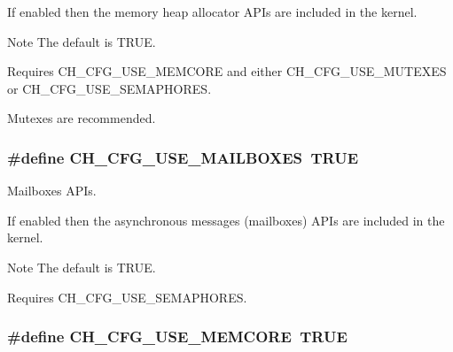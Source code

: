 If enabled then the memory heap allocator A\+P\+Is are included in the kernel.

\begin{DoxyNote}{Note}
The default is {\ttfamily T\+R\+U\+E}. 

Requires {\ttfamily C\+H\+\_\+\+C\+F\+G\+\_\+\+U\+S\+E\+\_\+\+M\+E\+M\+C\+O\+R\+E} and either {\ttfamily C\+H\+\_\+\+C\+F\+G\+\_\+\+U\+S\+E\+\_\+\+M\+U\+T\+E\+X\+E\+S} or {\ttfamily C\+H\+\_\+\+C\+F\+G\+\_\+\+U\+S\+E\+\_\+\+S\+E\+M\+A\+P\+H\+O\+R\+E\+S}. 

Mutexes are recommended. 
\end{DoxyNote}
\hypertarget{group__config_gae7b225553e9e069eda0dc0a251e0882c}{
\subsubsection[{C\+H\+\_\+\+C\+F\+G\+\_\+\+U\+S\+E\+\_\+\+M\+A\+I\+L\+B\+O\+X\+E\+S}]{\setlength{\rightskip}{0pt plus 5cm}\#define C\+H\+\_\+\+C\+F\+G\+\_\+\+U\+S\+E\+\_\+\+M\+A\+I\+L\+B\+O\+X\+E\+S~T\+R\+U\+E}}\label{group__config_gae7b225553e9e069eda0dc0a251e0882c}


Mailboxes A\+P\+Is. 

If enabled then the asynchronous messages (mailboxes) A\+P\+Is are included in the kernel.

\begin{DoxyNote}{Note}
The default is {\ttfamily T\+R\+U\+E}. 

Requires {\ttfamily C\+H\+\_\+\+C\+F\+G\+\_\+\+U\+S\+E\+\_\+\+S\+E\+M\+A\+P\+H\+O\+R\+E\+S}. 
\end{DoxyNote}
\hypertarget{group__config_gaad95228d05e4107b33836d30d21645a7}{
\subsubsection[{C\+H\+\_\+\+C\+F\+G\+\_\+\+U\+S\+E\+\_\+\+M\+E\+M\+C\+O\+R\+E}]{\setlength{\rightskip}{0pt plus 5cm}\#define C\+H\+\_\+\+C\+F\+G\+\_\+\+U\+S\+E\+\_\+\+M\+E\+M\+C\+O\+R\+E~T\+R\+U\+E}}\label{group__config_gaad95228d05e4107b33836d30d21645a7}


